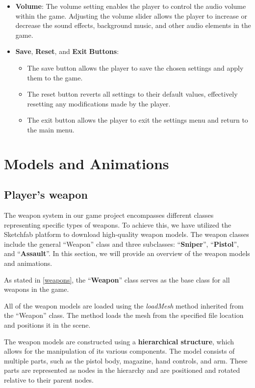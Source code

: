 \documentclass[12pt,a4paper,oneside]{article}
\theoremstyle{definition}
\begin{document}
\begin{itemize}
    \item \textbf{Volume}: The volume setting enables the player to control the audio volume within the game. Adjusting the volume slider allows the player to increase or decrease the sound effects, background music, and other audio elements in the game. 
    \item \textbf{Save}, \textbf{Reset}, and \textbf{Exit} \textbf{Buttons}: 
    \begin{itemize}
        \item The save button allows the player to save the chosen settings and apply them to the game.
        \item The reset button reverts all settings to their default values, effectively resetting any modifications made by the player.
        \item The exit button allows the player to exit the settings menu and return to the main menu.
    \end{itemize}

    
\end{itemize}


\section{Models and Animations}

\subsection{Player's weapon}
The weapon system in our game project encompasses different classes representing specific types of weapons. To achieve this, we have utilized the Sketchfab platform to download high-quality weapon models. The weapon classes include the general ``Weapon'' class and three subclasses: ``\textbf{Sniper}'', ``\textbf{Pistol}'', and ``\textbf{Assault}''. In this section, we will provide an overview of the weapon models and animations.

As stated in \ref{weapons}, the ``\textbf{Weapon}'' class serves as the base class for all weapons in the game.

All of the weapon models are loaded using the \textit{loadMesh} method inherited from the ``Weapon'' class. The method loads the mesh from the specified file location and positions it in the scene.

The weapon models are constructed using a \textbf{hierarchical structure}, which allows for the manipulation of its various components. The model consists of multiple parts, such as the pistol body, magazine, hand controls, and arm. These parts are represented as nodes in the hierarchy and are positioned and rotated relative to their parent nodes.
\end{document}
